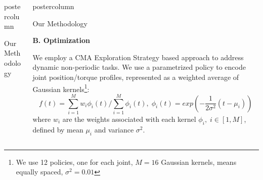 \documentclass{beamer}
\newlength{\columnheight}
\begin{document}
\begin{frame}
\begin{columns}
\begin{column}{.29\textwidth}
\begin{beamercolorbox}[center]{postercolumn}
\begin{minipage}{.98\textwidth}
{\begin{myblock}{Our Methodology}
\end{myblock}\vfill
}\end{minipage}\end{beamercolorbox}
\end{column}
	
\begin{column}{.3\textwidth}
\begin{beamercolorbox}[center]{postercolumn}
\begin{minipage}{.98\textwidth}  %
\parbox[t][\columnheight]{\textwidth}{ %
\begin{myblock}{Our Methodology}


% 
\begin{center}
 \textbf{B. Optimization}\\
\end{center}


We employ a CMA Exploration Strategy based approach to address dynamic non-periodic tasks.
% 
We use a parametrized policy to encode joint position/torque profiles, represented as 
a weighted average of Gaussian kernels\footnote{We use 12 policies, one for each joint, $M=16$ Gaussian kernels, means equally spaced, $\sigma^2 = 0.01$}: 
\begin{equation}
 \label{weighted_sum}
 f(t) = \sum_{i=1}^{M} w_i \phi_i(t)/ \sum_{i=1}^{M} \phi_i(t), \;  \phi_i(t) = exp(- \frac{1}{2 \sigma^2} (t-\mu_i))
 \end{equation}
where $w_i$ are the weights associated with each kernel $\phi_i, \; i \in [1, M]$, defined by mean $\mu_i$ and 
variance $\sigma^2$.
% 


\end{myblock}}
\end{minipage}
\end{beamercolorbox}
\end{column}
\end{columns}
\end{frame}
\end{document}
